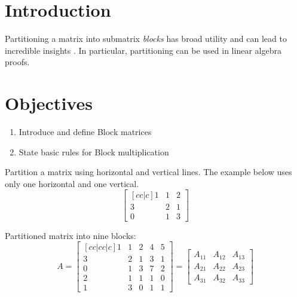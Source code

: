 %
\section*{Introduction}

Partitioning a matrix into  submatrix \textit{blocks} has broad utility and can lead to incredible insights \cite{carlsonmaa59}.  In particular, partitioning can be used in linear algebra proofs.   
\section*{Objectives}
\begin{enumerate}
	\item Introduce and define Block matrices
	\item State basic rules for Block multiplication   
	 \end{enumerate}



 

\begin{example} Partition a matrix using horizontal and vertical lines.  The example below uses only one horizontal and one vertical.
\[ \begin{bmatrix}[cc|c]  
  	1  &   1 &    2 \\
     	3  &    2  &    1\\
	\hline
     	0  &    1   &  3
     \end{bmatrix}  \]	
\end{example}
 
\begin{example} Partitioned matrix into nine blocks:
\[ A = \begin{bmatrix}[cc|cc|c]  
  	1  &   1 &    2 & 4 & 5 \\
     	3  &    2  &    1 & 3 & 1 \\
	\hline
     	0  &    1   &  3 & 7 & 2 \\ 
	2  &    1   &  1 & 1 & 0 \\ 
	\hline
	1  &   3   &  0 & 1 & 1
     \end{bmatrix}  = \begin{bmatrix} A_{11} &  A_{12} &  A_{13} \\  A_{21} &  A_{22} &  A_{23} \\  A_{31} &  A_{32} &  A_{33} \end{bmatrix} \]	
\end{example}


